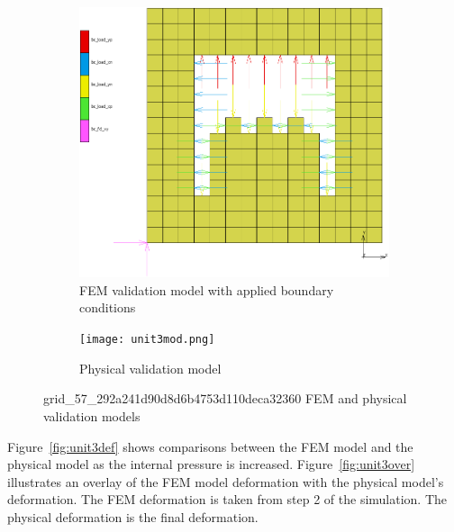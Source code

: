 \begin{figure}[H]
	\centering
	\begin{subfigure}[t]{0.5\textwidth}
		\includegraphics[width=\textwidth]{unit3bc.png}
		\caption{FEM validation model with applied boundary conditions}
		\label{fig:unit3bc}
	\end{subfigure}
	\hfill
	\begin{subfigure}[t]{0.4\textwidth}
		\centering
		\texttt{[image: unit3mod.png]}
		\caption{Physical validation model}
		\label{fig:unit3mod}
	\end{subfigure}
	\caption[FEM and physical models of unit 2]{grid\_57\_292a241d90d8d6b4753d110deca32360 FEM and physical validation models}
	\label{fig:unit3}
\end{figure}

Figure~\ref{fig:unit3def} shows comparisons between the FEM model and the physical model as the internal pressure is increased. Figure~\ref{fig:unit3over} illustrates an overlay of the FEM model deformation with the physical model's deformation. The FEM deformation is taken from step 2 of the simulation. The physical deformation is the final deformation.

